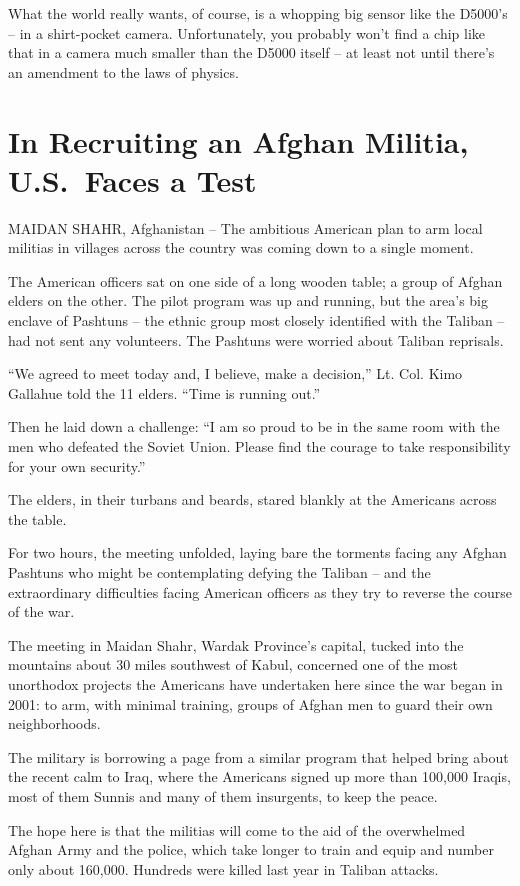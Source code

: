 \documentclass[12pt,a4paper,onecolumn]{article}
\begin{document}
What the world really wants, of course, is a whopping big sensor like the D5000's -- in a
shirt-pocket camera. Unfortunately, you probably won't find a chip like that in a camera much
smaller than the D5000 itself -- at least not until there's an amendment to the laws of physics.

\section{In Recruiting an Afghan Militia, U.S.~Faces a Test}

MAIDAN SHAHR, Afghanistan -- The ambitious American plan to arm local militias in villages across
the country was coming down to a single moment.

The American officers sat on one side of a long wooden table; a group of Afghan elders on the other.
The pilot program was up and running, but the area's big enclave of Pashtuns -- the ethnic group
most closely identified with the Taliban -- had not sent any volunteers. The Pashtuns were worried
about Taliban reprisals.

``We agreed to meet today and, I believe, make a decision,'' Lt. Col. Kimo Gallahue told the 11
elders. ``Time is running out.''

Then he laid down a challenge: ``I am so proud to be in the same room with the men who defeated the
Soviet Union. Please find the courage to take responsibility for your own security.''

The elders, in their turbans and beards, stared blankly at the Americans across the table.

For two hours, the meeting unfolded, laying bare the torments facing any Afghan Pashtuns who might
be contemplating defying the Taliban -- and the extraordinary difficulties facing American officers
as they try to reverse the course of the war.

The meeting in Maidan Shahr, Wardak Province's capital, tucked into the mountains about 30 miles
southwest of Kabul, concerned one of the most unorthodox projects the Americans have undertaken here
since the war began in 2001: to arm, with minimal training, groups of Afghan men to guard their own
neighborhoods.

The military is borrowing a page from a similar program that helped bring about the recent calm to
Iraq, where the Americans signed up more than 100,000 Iraqis, most of them Sunnis and many of them
insurgents, to keep the peace.

The hope here is that the militias will come to the aid of the overwhelmed Afghan Army and the
police, which take longer to train and equip and number only about 160,000. Hundreds were killed
last year in Taliban attacks.
\end{document}
